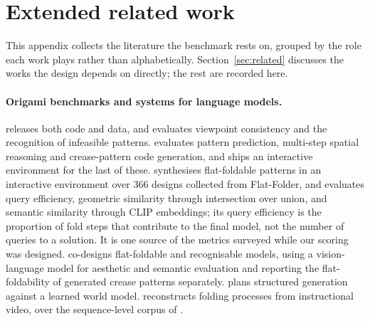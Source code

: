 \section{Extended related work}
\label{app:references}

This appendix collects the literature the benchmark rests on, grouped by the role each work plays
rather than alphabetically. Section~\ref{sec:related} discusses the works the design depends on
directly; the rest are recorded here.

\paragraph{Origami benchmarks and systems for language models.}
\citet{gamibench} releases both code and data, and evaluates viewpoint consistency and the
recognition of infeasible patterns. \citet{origamispace} evaluates pattern prediction, multi-step
spatial reasoning and crease-pattern code generation, and ships an interactive environment for the
last of these. \citet{origamibench} synthesises flat-foldable patterns in an interactive
environment over 366
designs collected from Flat-Folder, and evaluates query efficiency, geometric similarity through
intersection over union, and semantic similarity through CLIP embeddings; its query efficiency is
the proportion of fold steps that contribute to the final model, not the number of queries to a
solution. It is one source of the metrics surveyed while our scoring was designed.
\citet{corigami} co-designs flat-foldable and recognisable models, using a vision-language model
for aesthetic and semantic evaluation and reporting the flat-foldability of generated crease
patterns separately. \citet{learn2fold} plans structured generation against a learned world model.
\citet{foldingagent} reconstructs folding processes from instructional video, over the
sequence-level corpus of \citet{purelandfold}.

